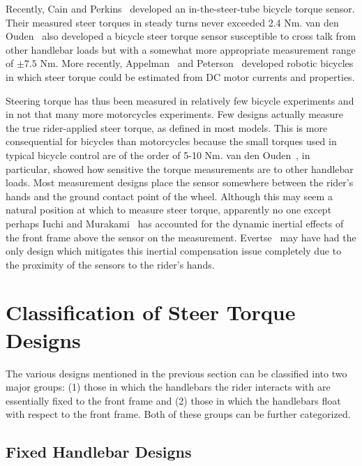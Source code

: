 \documentclass[10pt]{article}
\begin{document}
Recently, Cain and Perkins~\cite{Cain2010,Cain2012} developed an in-the-steer-tube bicycle torque
sensor. Their measured steer torques in steady turns never exceeded
2.4 Nm. van den Ouden~\cite{Ouden2011} also developed a bicycle steer torque sensor
susceptible to cross talk from other handlebar loads but with a somewhat more appropriate
measurement range of $\pm7.5$ Nm. More recently, Appelman~\cite{Appelman2012} and
Peterson~\cite{Peterson2013} developed robotic bicycles in which steer torque could
be estimated from DC motor currents and properties.



Steering torque has thus been measured in relatively few bicycle
experiments and in not that many more motorcycles experiments. Few
designs actually measure the true rider-applied steer torque, as defined
in most models. This is more consequential for bicycles than motorcycles
because the small torques used in typical bicycle control are of the order of
5-10 Nm. van den Ouden~\cite{Ouden2011}, in particular, showed how sensitive
the torque measurements are to other handlebar loads. Most measurement 
designs place the sensor somewhere between the rider's hands and the ground
contact point of the wheel. Although this may seem a natural position at which to measure steer
torque, apparently no one  except perhaps Iuchi and Murakami~\cite{Iuchi2006} 
has accounted for the dynamic inertial effects of the front frame above the sensor on the measurement.
Evertse~\cite{Evertse2010} may have had the only design which mitigates this
inertial compensation issue completely due to the proximity of the sensors to
the rider's hands.  


\section*{Classification of Steer Torque Designs}

The various designs mentioned in the previous section can be classified into
two major groups: (1) those in which the handlebars the rider interacts
with are essentially fixed to the front frame and (2) those in which the
handlebars float with respect to the front frame. Both of these groups can be
further categorized.

\subsection*{Fixed Handlebar Designs}
\end{document}
